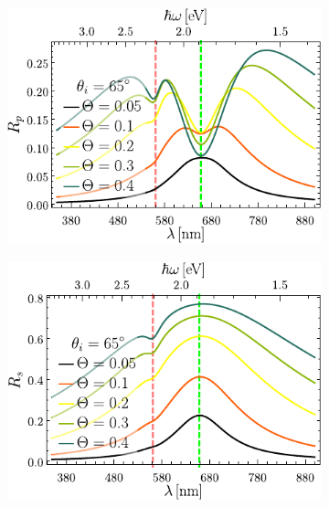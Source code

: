 		\begin{figure}[h!]\centering\hspace*{-1.5em}
	\begin{subfigure}{.01\linewidth}\caption{}\label{sfig:FSM-cutp}\vspace{4.5cm}\end{subfigure}
	\begin{subfigure}{.45\linewidth}\hspace*{-1.5em}
	\includegraphics[scale=1]{2-Resultados/figs/4-Wp4FSMThetaVar/cut_angle_65_p.pdf}\end{subfigure}
	\begin{subfigure}{.01\linewidth}\caption{}\label{sfig:FSM-cuts}\vspace{4.5cm}\end{subfigure}\hspace*{-1.em}
	\begin{subfigure}{.45\linewidth}\centering
	\includegraphics[scale=1 ]{2-Resultados/figs/4-Wp4FSMThetaVar/cut_angle_65_s.pdf}\end{subfigure}\vspace*{-.5em}

\end{figure}
